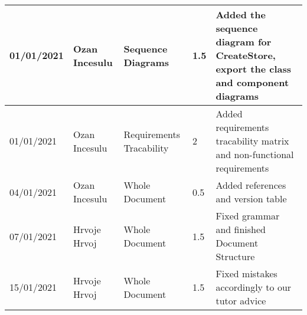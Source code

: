 \newpage
\begin{table}[H]
    \begin{tabular}{|p{2cm}|p{2cm}|p{2.5cm}|p{1.5cm}|p{7.5cm}|}
        \hline

        01/01/2021 & Ozan Incesulu & Sequence Diagrams & 1.5              & Added the sequence diagram for CreateStore, export the class and component diagrams \\ \hline
        01/01/2021 & Ozan Incesulu & Requirements Tracability & 2 & Added requirements tracability matrix and non-functional requirements \\ \hline
        04/01/2021 & Ozan Incesulu & Whole Document & 0.5 & Added references and version table \\ \hline
        07/01/2021 & Hrvoje Hrvoj  & Whole Document & 1.5 & Fixed grammar and finished Document Structure \\ \hline
        15/01/2021 & Hrvoje Hrvoj  & Whole Document & 1.5 & Fixed mistakes accordingly to our tutor advice \\ \hline
    \end{tabular}
\end{table}
